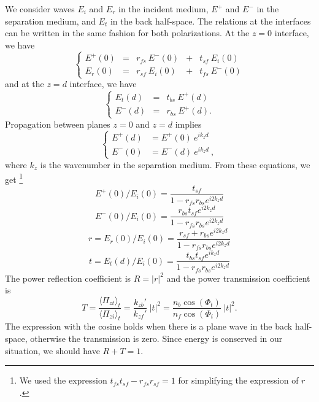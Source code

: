 We consider waves $E_i$ and $E_r$ in the incident medium, $E^+$ and $E^-$ in the separation medium, and $E_t$ in the back half-space.
The relations at the interfaces can be written in the same fashion for both polarizations. 
At the $z=0$ interface, we have
\begin{equation*}
\left\{
\begin{array}{lllll}\label{eq:continuity0}
E^+(0)  & = & r_{fs}\ E^-(0)  & + & t_{sf}\ E_i(0)    \\
E_r(0)  & = & r_{sf}\ E_i(0)  & + & t_{fs}\ E^-(0)
\end{array}\right.
\end{equation*}
and at the $z=d$ interface, we have
\begin{equation*}
\left\{
\begin{array}{lll}\label{eq:continuityd}
E_t(d)  & = & t_{bs}\ E^+(d)  \\
E^-(d)  & = & r_{bs}\ E^+(d).
\end{array}\right.
\end{equation*}
Propagation between planes $z=0$ and $z=d$ implies
\begin{equation*}
\left\{
\begin{array}{lll}\label{eq:0tod}
E^+(d) & = E^+(0)\ e^{ik_z d}\\
E^-(0) & = E^-(d)\ e^{ik_z d} \ ,
\end{array}\right.
\end{equation*}
where $k_z$ is the wavenumber in the separation medium.
From these equations, we get%
\footnote{We used the expression $t_{fs} t_{sf} - r_{fs} r_{sf} = 1$ for simplifying the expression of $r$.}
\begin{equation*}
E^+(0) / E_i(0) =\frac{t_{sf}}{1 - r_{fs}r_{bs}e^{i2k_z d}}
\end{equation*}
%
\begin{equation*}
E^-(0) / E_i(0) =\frac{r_{bs} t_{sf} e^{i2k_z d}}{1-r_{fs}r_{bs}e^{i2k_z d}}
\end{equation*}
%
\begin{equation*}\label{eq:reflectivewave}
r = E_r(0) / E_i(0) =
\frac{r_{sf} + r_{bs} e^{i2k_z d}}{1-r_{fs}r_{bs}e^{i2k_z d}}
\end{equation*}
%
\begin{equation*}\label{eq:transmittedwave}
t = E_t(d) / E_i(0) =
\frac{t_{bs} t_{sf} e^{ik_z d}}{1 - r_{fs}r_{bs}e^{i2k_z d}}
\end{equation*}
The power reflection coefficient is $R = |r|^2$ and the power transmission coefficient is
$$
T = \frac{\langle \Pi_{zt} \rangle_t}{\langle \Pi_{zi} \rangle_t} 
= \frac{k_{zb}'}{k_{zf}'} \ |t|^2 = 
\frac{n_b\cos(\Phi _t)}{n_f\cos(\Phi _i)}\ |t|^2.
$$
The expression with the cosine holds when there is a plane wave in the back half-space, otherwise the transmission is zero.
Since energy is conserved in our situation, we should have $R+T=1$.

